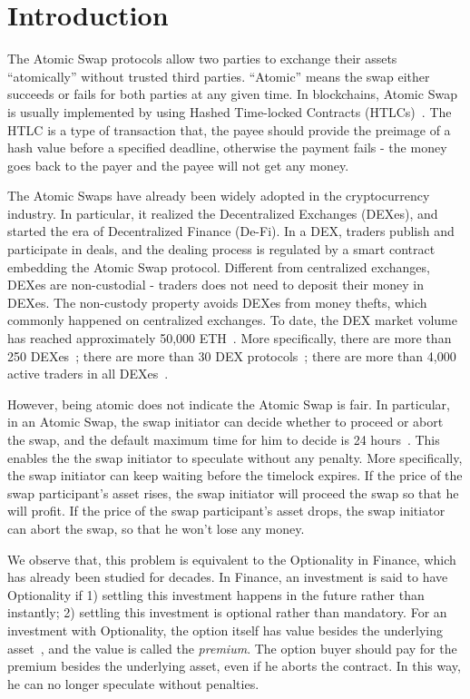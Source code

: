 \section{Introduction}
\label{sec:intro}

The Atomic Swap protocols allow two parties to exchange their assets ``atomically'' without trusted third parties.
``Atomic'' means the swap either succeeds or fails for both parties at any given time.
In blockchains, Atomic Swap is usually implemented by using Hashed Time-locked Contracts (HTLCs)~\cite{poon2016bitcoin}.
The HTLC is a type of transaction that, the payee should provide the preimage of a hash value before a specified deadline, otherwise the payment fails - the money goes back to the payer and the payee will not get any money.

The Atomic Swaps have already been widely adopted in the cryptocurrency industry.
In particular, it realized the Decentralized Exchanges (DEXes), and started the era of Decentralized Finance (De-Fi).
In a DEX, traders publish and participate in deals, and the dealing process is regulated by a smart contract embedding the Atomic Swap protocol.
Different from centralized exchanges, DEXes are non-custodial - traders does not need to deposit their money in DEXes.
The non-custody property avoids DEXes from money thefts, which commonly happened on centralized exchanges.
To date, the DEX market volume has reached approximately 50,000 ETH~\cite{dexwatch}.
More specifically,
there are more than 250 DEXes~\cite{distribuyed/index};
there are more than 30 DEX protocols~\cite{evbots/dex-protocols};
there are more than 4,000 active traders in all DEXes~\cite{dexwatch}.



However, being atomic does not indicate the Atomic Swap is fair.
In particular, in an Atomic Swap, the swap initiator can decide whether to proceed or abort the swap, and the default maximum time for him to decide is 24 hours~\cite{nolan2013alt}.
This enables the the swap initiator to speculate without any penalty.
More specifically, the swap initiator can keep waiting before the timelock expires.
If the price of the swap participant's asset rises, the swap initiator will proceed the swap so that he will profit.
If the price of the swap participant's asset drops, the swap initiator can abort the swap, so that he won't lose any money.

We observe that, this problem is equivalent to the Optionality in Finance, which has already been studied for decades.
In Finance, an investment is said to have Optionality if
1) settling this investment happens in the future rather than instantly;
2) settling this investment is optional rather than mandatory.
For an investment with Optionality, the option itself has value besides the underlying asset~\cite{higham2004introduction}, and the value is called the \textit{premium}.
The option buyer should pay for the premium besides the underlying asset, even if he aborts the contract.
In this way, he can no longer speculate without penalties.


